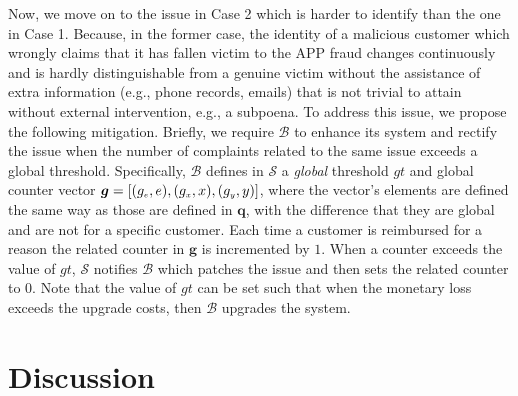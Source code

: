 Now, we move on to the issue in Case 2 which is harder to identify than the one in Case 1. Because, in the former case, the identity of a malicious customer which wrongly claims that it has fallen victim to the APP fraud changes continuously and  is hardly distinguishable from a genuine victim without the assistance of extra information (e.g., phone records, emails) that is not trivial  to attain without  external intervention, e.g., a subpoena. To address this issue, we  propose the following mitigation.  Briefly, we require $\mathcal{B}$ to enhance its system and rectify the issue when the number of complaints related to the same issue exceeds a global threshold. Specifically, $\mathcal{B}$  defines in $\mathcal{S}$ a \emph{global} threshold $gt$ and global counter vector $\bm g=[(g_{\scriptscriptstyle e}, e),(g_{\scriptscriptstyle  x}, x),(g_{\scriptscriptstyle y}, y)]$,   where the vector's elements are defined the same way as those are defined in $\bm q$, with the difference that they are global and are not for a specific customer. Each time a customer is reimbursed for a reason   the related counter in $\bm g$ is incremented by $1$. When a counter exceeds the value of $gt$, $\mathcal{S}$ notifies $\mathcal{B}$ which patches the issue and then sets the related counter to $0$. Note that the value of $gt$ can be set such that when the monetary loss exceeds the upgrade costs, then  $\mathcal{B}$ upgrades the system.  















\section{Discussion}
 
 
